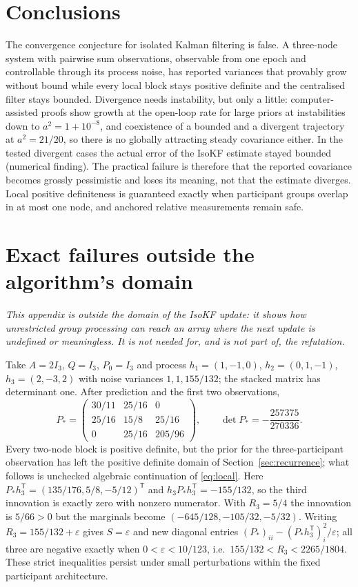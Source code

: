 \documentclass[11pt,a4paper]{article}
\numberwithin{equation}{section}
\theoremstyle{remark}\newtheorem{remark}[theorem]{Remark}
\newcommand{\T}{^{\mathsf T}}
\begin{document}
\section{Conclusions}\label{sec:conc}

The convergence conjecture for isolated Kalman filtering is false. A three-node system with
pairwise sum observations, observable from one epoch and controllable through its process noise,
has reported variances that provably grow without bound while every local block stays
positive definite and the centralised filter stays bounded. Divergence needs instability, but
only a little: computer-assisted proofs show growth at the open-loop rate for large priors at
instabilities down to $a^2=1+10^{-8}$, and coexistence of a bounded and a divergent trajectory
at $a^2=21/20$, so there is no globally attracting steady covariance either. In the tested divergent
cases the actual error of the IsoKF estimate stayed bounded (numerical finding). The practical failure is therefore that the reported
covariance becomes grossly pessimistic and loses its meaning, not that the estimate diverges.
Local positive definiteness is guaranteed exactly when participant groups overlap in at most
one node, and anchored relative measurements remain safe.

\appendix

\section{Exact failures outside the algorithm's domain}\label{app:witness}

\emph{This appendix is outside the domain of the IsoKF update: it shows how unrestricted group
processing can reach an array where the next update is undefined or meaningless. It is not
needed for, and is not part of, the refutation.}

Take $A=2I_3$, $Q=I_3$, $P_0=I_3$ and process $h_1=(1,-1,0)$, $h_2=(0,1,-1)$, $h_3=(2,-3,2)$ with
noise variances $1,1,155/132$; the stacked matrix has determinant one. After prediction and
the first two observations,
\[
P_*=\begin{pmatrix}30/11&25/16&0\\25/16&15/8&25/16\\0&25/16&205/96\end{pmatrix},
\qquad\det P_*=-\frac{257375}{270336}.
\]
Every two-node block is positive definite, but the prior for the three-participant observation
has left the positive definite domain of Section~\ref{sec:recurrence}; what follows is
unchecked algebraic continuation of \eqref{eq:local}. Here $P_*h_3\T=(135/176,5/8,-5/12)\T$ and
$h_3P_*h_3\T=-155/132$, so the third innovation is exactly zero with nonzero numerator. With
$R_3=5/4$ the innovation is $5/66>0$ but the marginals become $(-645/128,-105/32,-5/32)$. Writing
$R_3=155/132+\varepsilon$ gives $S=\varepsilon$ and new diagonal entries
$(P_*)_{ii}-(P_*h_3\T)_i^2/\varepsilon$; all three are negative exactly when
$0<\varepsilon<10/123$, i.e.\ $155/132<R_3<2265/1804$. These strict inequalities persist under
small perturbations within the fixed participant architecture.
\end{document}
